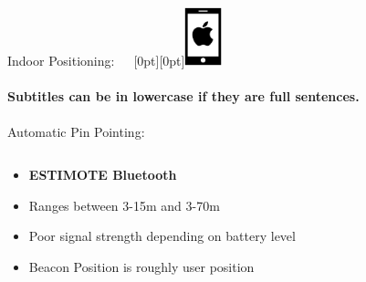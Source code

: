 \documentclass[11pt]{beamer}
\begin{document}
\begin{frame}{Indoor Positioning:~~~\raisebox{-10pt}[0pt][0pt]{\includegraphics[width=0.08\textwidth]{tech-stack-apple}}}

\framesubtitle{Subtitles can be in lowercase if they are full sentences.}
Automatic Pin Pointing:

  \begin{columns}[T]
  \begin{column}{.6\textwidth}
  \begin{itemize}


  \item  \textbf{ESTIMOTE Bluetooth} \\
  \item Ranges between 3-15m and 3-70m
  \item Poor signal strength depending on battery level
  \item Beacon Position is roughly user position
  \end{itemize}
  \end{column}
  \begin{column}{.4\textwidth}

\end{column}
\end{columns}
\end{frame}
\end{document}
